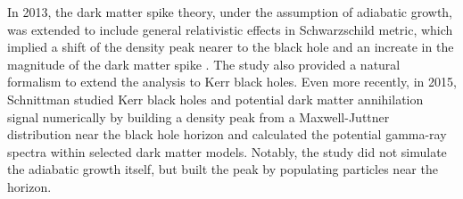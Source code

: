 \documentclass[12pt]{article}
\begin{document}

% 



In 2013, the dark matter spike theory, under the assumption of adiabatic growth, 
was extended to include general relativistic effects in Schwarzschild metric, 
which implied a shift of the density peak nearer to the black hole  
and an increate in the magnitude of the dark matter spike 
\citep{Sadeghian_Ferrer_Will_2013}. The study
also provided a natural formalism to extend the analysis to 
Kerr black holes. Even more recently, in 2015, Schnittman 
studied Kerr black holes and potential dark matter annihilation signal 
numerically by building a density peak from a Maxwell-Juttner 
distribution near the black hole horizon and calculated 
the potential gamma-ray spectra within selected 
dark matter models. 
Notably, the study did not simulate the adiabatic 
growth itself, but built the peak by populating particles 
near the horizon.

\end{document}
